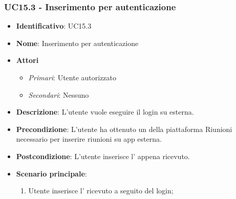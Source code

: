 \subsubsection{UC15.3 - Inserimento  per autenticazione }
\begin{itemize}
	\item \textbf{Identificativo}: UC15.3
	\item \textbf{Nome}: Inserimento  per autenticazione
	\item \textbf{Attori}
	\begin{itemize} 
		\item \textit{Primari}: Utente autorizzato
		\item \textit{Secondari}: Nessuno
	\end{itemize}
	\item \textbf{Descrizione}: L'utente vuole eseguire il login su  esterna.
	\item \textbf{Precondizione}: L'utente ha ottenuto un  della piattaforma Riunioni necessario per inserire riunioni su app esterna.
	\item \textbf{Postcondizione}: L'utente inserisce l' appena ricevuto.
	\item \textbf{Scenario principale}: \begin{enumerate}
		\item Utente inserisce l' ricevuto a seguito del login; 
	\end{enumerate}
\end{itemize}

